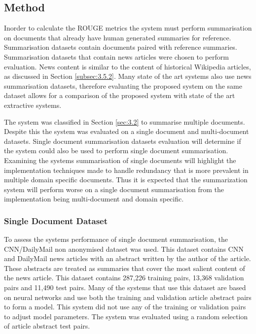 \subsection{Method}
Inorder to calculate the ROUGE metrics the system must perform summarisation on documents that already have human generated summaries for reference. Summarisation datasets contain documents paired with reference summaries. Summarisation datasets that contain news articles were chosen to perform evaluation. News content is similar to the content of historical Wikipedia articles, as discussed in Section \ref{subsec:3.5.2}. Many state of the art systems also use news summarisation datasets, therefore evaluating the proposed system on the same dataset allows for a comparison of the proposed system with state of the art extractive systems.

The system was classified in Section \ref{sec:3.2} to summarise multiple documents. Despite this the system was evaluated on a single document and multi-document datasets. Single document summarisation datasets evaluation will determine if the system could also be used to perform single document summarisation. Examining the systems summarisation of single documents will highlight the implementation techniques made to handle redundancy that is more prevalent in multiple domain specific documents. Thus it is expected that the summarization system will perform worse on a single document summarisation from the implementation being multi-document and domain specific.

\subsubsection{Single Document Dataset}
To assess the systems performance of single document summarisation, the CNN/DailyMail non anonymised dataset \citep{see2017get} was used. This dataset contains CNN and DailyMail news articles with an abstract written by the author of the article. These abstracts are treated as summaries that cover the most salient content of the news article. This dataset contains 287,226 training pairs, 13,368 validation pairs and 11,490 test pairs. Many of the systems that use this dataset are based on neural networks and use both the training and validation article abstract pairs to form a model. This system did not use any of the training or validation pairs to adjust model parameters. The system was evaluated using a random selection of article abstract test pairs.

